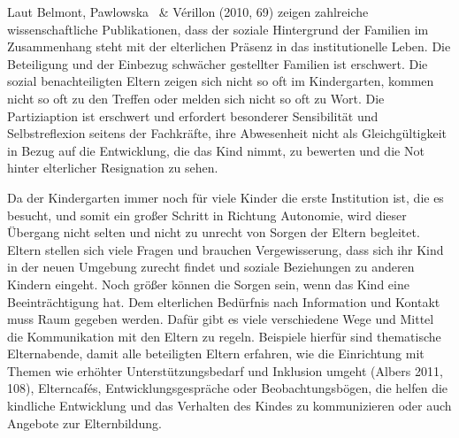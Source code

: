 Laut Belmont, Pawlowska ~\& Vérillon (2010, 69) zeigen zahlreiche wissenschaftliche Publikationen, dass der soziale Hintergrund der Familien im Zusammenhang steht mit der elterlichen Präsenz in das institutionelle Leben. Die Beteiligung und der Einbezug schwächer gestellter Familien ist erschwert. Die sozial benachteiligten Eltern zeigen sich nicht so oft im Kindergarten, kommen nicht so oft zu den Treffen oder melden sich nicht so oft zu Wort. Die Partiziaption ist erschwert und erfordert besonderer Sensibilität und Selbstreflexion seitens der Fachkräfte, ihre Abwesenheit nicht als Gleichgültigkeit in Bezug auf die Entwicklung, die das Kind nimmt, zu bewerten und die Not hinter elterlicher Resignation zu sehen.

Da der Kindergarten immer noch für viele Kinder die erste Institution ist, die es besucht, und somit ein großer Schritt in Richtung Autonomie, wird dieser Übergang nicht selten und nicht zu unrecht von Sorgen der Eltern begleitet. Eltern stellen sich viele Fragen und brauchen Vergewisserung, dass sich ihr Kind in der neuen Umgebung zurecht findet und soziale Beziehungen zu anderen Kindern eingeht. Noch größer können die Sorgen sein, wenn das Kind eine Beeinträchtigung hat. Dem elterlichen Bedürfnis nach Information und Kontakt muss Raum gegeben werden. Dafür gibt es viele verschiedene Wege und Mittel die Kommunikation mit den Eltern zu regeln. Beispiele hierfür sind thematische Elternabende, damit alle beteiligten Eltern erfahren, wie die Einrichtung mit Themen wie erhöhter Unterstützungsbedarf und Inklusion umgeht (Albers 2011, 108), Elterncafés, Entwicklungsgespräche oder Beobachtungsbögen, die helfen die kindliche Entwicklung und das Verhalten des Kindes zu kommunizieren oder auch Angebote zur Elternbildung.  
  
